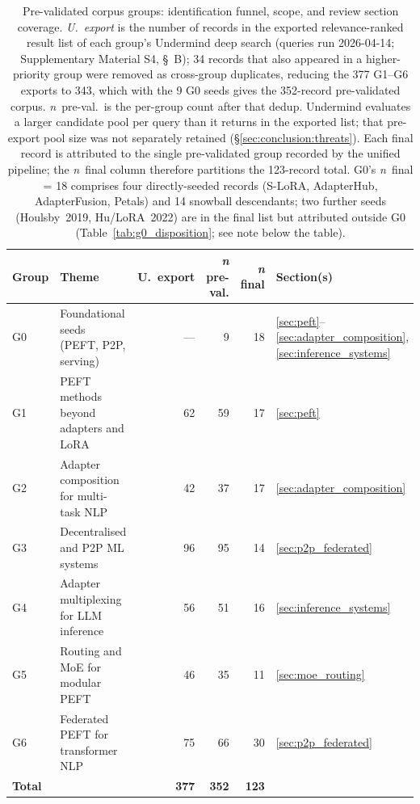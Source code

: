\begin{table}[H]
\centering
\caption{Pre-validated corpus groups: identification funnel, scope, and review section coverage. \emph{U.\ export} is the number of records in the exported relevance-ranked result list of each group's Undermind deep search (queries run 2026-04-14; Supplementary Material S4, \S~B); 34 records that also appeared in a higher-priority group were removed as cross-group duplicates, reducing the 377 G1--G6 exports to 343, which with the 9 G0 seeds gives the 352-record pre-validated corpus. \emph{n}~pre-val.\ is the per-group count after that dedup. Undermind evaluates a larger candidate pool per query than it returns in the exported list; that pre-export pool size was not separately retained (\S\ref{sec:conclusion:threats}). Each final record is attributed to the single pre-validated group recorded by the unified pipeline; the \emph{n}~final column therefore partitions the 123-record total. G0's \emph{n}~final = 18 comprises four directly-seeded records (S-LoRA, AdapterHub, AdapterFusion, Petals) and 14 snowball descendants; two further seeds (Houlsby~2019, Hu/LoRA~2022) are in the final list but attributed outside G0 (Table~\ref{tab:g0_disposition}; see note below the table).}
\label{tab:groups}
\begin{tabular}{lp{4.4cm}rrrl}
\toprule
\textbf{Group} & \textbf{Theme} & \textbf{U.\ export} & \textbf{\textit{n} pre-val.} &
\textbf{\textit{n} final} & \textbf{Section(s)} \\
\midrule
G0 & Foundational seeds (PEFT, P2P, serving) & ---  & 9   & 18  &
\ref{sec:peft}--\ref{sec:adapter_composition}, \ref{sec:inference_systems} \\
G1 & PEFT methods beyond adapters and LoRA   & 62  & 59  & 17  & \ref{sec:peft} \\
G2 & Adapter composition for multi-task NLP  & 42  & 37  & 17  &
\ref{sec:adapter_composition} \\
G3 & Decentralised and P2P ML systems        & 96  & 95  & 14  &
\ref{sec:p2p_federated} \\
G4 & Adapter multiplexing for LLM inference  & 56  & 51  & 16  &
\ref{sec:inference_systems} \\
G5 & Routing and MoE for modular PEFT        & 46  & 35  & 11  &
\ref{sec:moe_routing} \\
G6 & Federated PEFT for transformer NLP      & 75  & 66  & 30  &
\ref{sec:p2p_federated} \\
\midrule
\textbf{Total} & & \textbf{377} & \textbf{352} & \textbf{123} & \\

\end{tabular}
\end{table}
